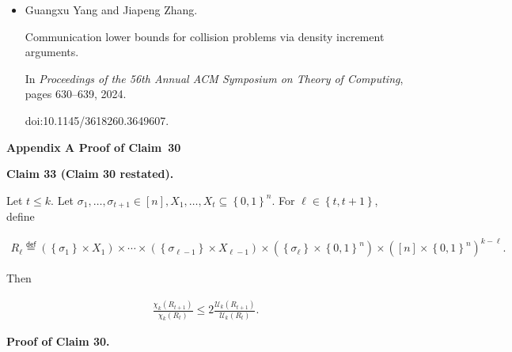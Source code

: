 \begin{itemize}
doi:10.4230/LIPIcs.CCC.2018.9.





\item[] 
[46]

Guangxu Yang and Jiapeng Zhang.


Communication lower bounds for collision problems via density
increment arguments.


In \emph{Proceedings of the 56th Annual ACM Symposium on Theory of
Computing}, pages 630–639, 2024.


doi:10.1145/3618260.3649607.





\end{itemize}




\par\medskip\noindent\textbf{
Appendix A Proof of Claim 30
}\par





\par\medskip\noindent\textbf{
Claim 33 (Claim 30 restated). 
}\par



Let $t\leq k$.
Let $\sigma_{1},\dots,\sigma_{t+1}\in[n],X_{1},\dots,X_{t}\subseteq\left\{0,1\right\}^{n}$.
For $\ell\in\left\{t,t+1\right\}$, define\par


\[\begin{gathered}
R_{\ell}\stackrel{{\scriptstyle\mathsf{def}}}{{=}}(\left\{\sigma_{1}\right\}\times X_{1})\times\cdots\times(\left\{\sigma_{\ell-1}\right\}\times X_{\ell-1})\times(\left\{\sigma_{\ell}\right\}\times\left\{0,1\right\}^{n})\times([n]\times\left\{0,1\right\}^{n})^{k-\ell}.
\end{gathered}\]


Then\par


\[\begin{gathered}
\frac{\chi_{k}(R_{t+1})}{\chi_{k}(R_{t})}\leq 2\frac{\mathcal{U}_{k}(R_{t+1})}{\mathcal{U}_{k}(R_{t})}.
\end{gathered}\]






\par\medskip\noindent\textbf{
\textbf{Proof of Claim 30}.}\par




